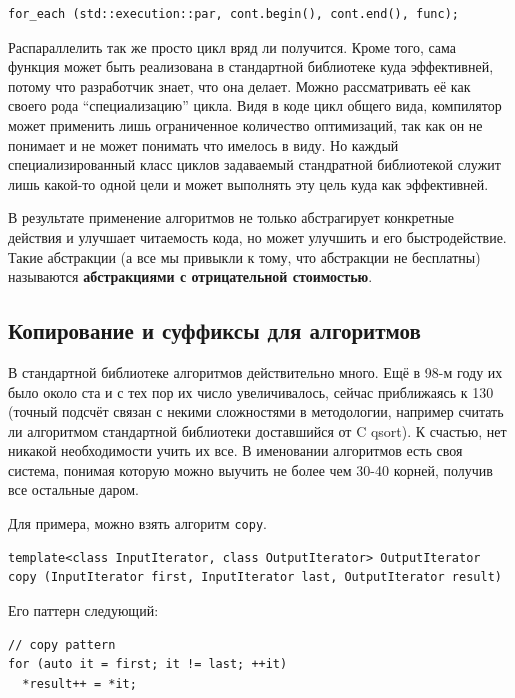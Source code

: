 \documentclass[a4paper,12pt,oneside]{book}
\begin{document}
\begin{lstlisting}
for_each (std::execution::par, cont.begin(), cont.end(), func);
\end{lstlisting}

Распараллелить так же просто цикл вряд ли получится. Кроме того, сама функция может быть реализована в стандартной библиотеке куда эффективней, потому что разработчик знает, что она делает. Можно рассматривать её как своего рода ``специализацию'' цикла. Видя в коде цикл общего вида, компилятор может применить лишь ограниченное количество оптимизаций, так как он не понимает и не может понимать что имелось в виду. Но каждый специализированный класс циклов задаваемый стандратной библиотекой служит лишь какой-то одной цели и может выполнять эту цель куда как эффективней.

В результате применение алгоритмов не только абстрагирует конкретные действия и улучшает читаемость кода, но может улучшить и его быстродействие. Такие абстракции (а все мы привыкли к тому, что абстракции не бесплатны) называются \textbf{абстракциями с отрицательной стоимостью}.

\subsection{Копирование и суффиксы для алгоритмов}

В стандартной библиотеке алгоритмов действительно много. Ещё в 98-м году их было около ста и с тех пор их число увеличивалось, сейчас приближаясь к 130 (точный подсчёт связан с некими сложностями в методологии, например считать ли алгоритмом стандартной библиотеки доставшийся от C qsort). К счастью, нет никакой необходимости учить их все. В именовании алгоритмов есть своя система, понимая которую можно выучить не более чем 30-40 корней, получив все остальные даром.

Для примера, можно взять алгоритм \lstinline!copy!. 

\begin{lstlisting}
template<class InputIterator, class OutputIterator> OutputIterator
copy (InputIterator first, InputIterator last, OutputIterator result)
\end{lstlisting}

Его паттерн следующий:

\begin{lstlisting}
// copy pattern
for (auto it = first; it != last; ++it)
  *result++ = *it;
\end{lstlisting}
\end{document}
